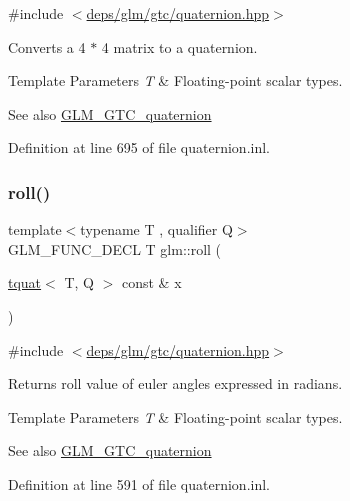 {\ttfamily \#include $<$\hyperlink{gtc_2quaternion_8hpp}{deps/glm/gtc/quaternion.\+hpp}$>$}

Converts a 4 $\ast$ 4 matrix to a quaternion.


\begin{DoxyTemplParams}{Template Parameters}
{\em T} & Floating-\/point scalar types.\\
\hline
\end{DoxyTemplParams}
\begin{DoxySeeAlso}{See also}
\hyperlink{group__gtc__quaternion}{G\+L\+M\+\_\+\+G\+T\+C\+\_\+quaternion} 
\end{DoxySeeAlso}


Definition at line 695 of file quaternion.\+inl.

\mbox{\label{group__gtc__quaternion_ga3ff93afbd9cc29f2ad217f2228e8a95b}} 
\subsubsection{\texorpdfstring{roll()}{roll()}}
{\footnotesize\ttfamily template$<$typename T , qualifier Q$>$ \\
G\+L\+M\+\_\+\+F\+U\+N\+C\+\_\+\+D\+E\+CL T glm\+::roll (\begin{DoxyParamCaption}\item[{\hyperlink{structglm_1_1tquat}{tquat}$<$ T, Q $>$ const \&}]{x }\end{DoxyParamCaption})}



{\ttfamily \#include $<$\hyperlink{gtc_2quaternion_8hpp}{deps/glm/gtc/quaternion.\+hpp}$>$}

Returns roll value of euler angles expressed in radians.


\begin{DoxyTemplParams}{Template Parameters}
{\em T} & Floating-\/point scalar types.\\
\hline
\end{DoxyTemplParams}
\begin{DoxySeeAlso}{See also}
\hyperlink{group__gtc__quaternion}{G\+L\+M\+\_\+\+G\+T\+C\+\_\+quaternion} 
\end{DoxySeeAlso}


Definition at line 591 of file quaternion.\+inl.

